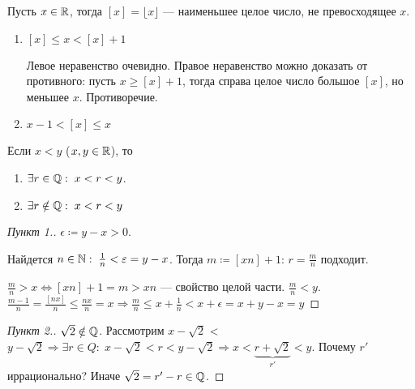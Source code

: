 \begin{definition}
    Пусть $x \in \mathbb{R}$, тогда  $[x] = \lfloor x \rfloor$ --- наименьшее целое число, не превосходящее  $x$.
\end{definition}
\begin{enumerate}
    \item $[x]  \le x < [x] + 1$

        Левое неравенство очевидно. Правое неравенство можно доказать от противного: пусть $x \ge [x] + 1$, тогда справа целое число большое $[x]$, но меньшее  $x$. Противоречие.
    \item $x - 1 < [x] \le x$
\end{enumerate}

\begin{theorem}
    Если $x < y$ ($x, y \in \mathbb{R}$), то
    \begin{enumerate}
        \item $\exists r \in \mathbb{Q}: \; x < r < y$.
        \item $\exists r \notin \mathbb{Q}: \; x < r < y$
    \end{enumerate}
\end{theorem}
\begin{proof}[Пункт 1.]
    $\epsilon \coloneqq y - x > 0$.
    
    Найдется  $n \in \mathbb{N}: \; \frac{1}{n} < \varepsilon = y - x$. Тогда $m \coloneqq [xn]+1$:  $r = \frac{m}{n}$ подходит.
    
    $\frac{m}{n} > x \iff [xn] + 1 = m > xn$ --- свойство целой части.
    $\frac{m}{n} < y$. $\frac{m-1}{n} = \frac{[nx]}{n} \le \frac{nx}{n} = x \Rightarrow \frac{m}{n} \le x + \frac{1}{n} < x + \epsilon = x + y - x = y$
\end{proof}
\begin{proof}[Пункт 2.]
    $\sqrt{2} \notin \mathbb{Q}$. Рассмотрим $x - \sqrt{2}$ <  $y - \sqrt{2} \Rightarrow \exists r \in Q: \; x - \sqrt{2} < r < y - \sqrt{2} \Rightarrow x < \underbrace{r + \sqrt{2}}_{r'} < y$. Почему  $r'$ иррационально? Иначе  $\sqrt{2} = r' - r \in \mathbb{Q}$.
\end{proof}

